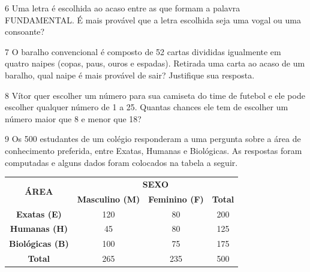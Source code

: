 
\num{6} Uma letra é escolhida ao acaso entre as que formam a palavra
FUNDAMENTAL. É mais provável que a letra escolhida seja uma vogal ou uma consoante?


\num{7} O baralho convencional é composto de 52 cartas divididas igualmente em quatro
naipes (copas, paus, ouros e espadas). Retirada uma carta ao acaso de um baralho,
qual naipe é mais provável de sair? Justifique sua resposta.


\num{8} Vítor quer escolher um número para sua camiseta do time de futebol e ele
pode escolher qualquer número de 1 a 25. Quantas chances ele tem de
escolher um número maior que 8 e menor que 18?




\num{9} Os 500 estudantes de um colégio responderam a uma pergunta sobre a
área de conhecimento preferida, entre Exatas, Humanas e
Biológicas. As respostas foram computadas e alguns dados foram colocados
na tabela a seguir.

\begin{center}
\begin{tabular}{c|ccc}
\hline
\multirow{2}{*}{\textbf{ÁREA}} & \multicolumn{3}{c}{\textbf{SEXO}} \\ \cline{2-4} 
 & \multicolumn{1}{c|}{\textbf{Masculino (M)}} & \multicolumn{1}{c|}{\textbf{Feminino (F)}} & \textbf{Total} \\ \hline
\textbf{Exatas (E)} & \multicolumn{1}{c|}{120} & \multicolumn{1}{c|}{80} & 200 \\ \hline
\textbf{Humanas (H)} & \multicolumn{1}{c|}{45} & \multicolumn{1}{c|}{80} & 125 \\ \hline
\textbf{Biológicas (B)} & \multicolumn{1}{c|}{100} & \multicolumn{1}{c|}{75} & 175 \\ \hline
\textbf{Total} & \multicolumn{1}{c|}{265} & \multicolumn{1}{c|}{235} & 500 \\ \hline
\end{tabular}
\end{center}

